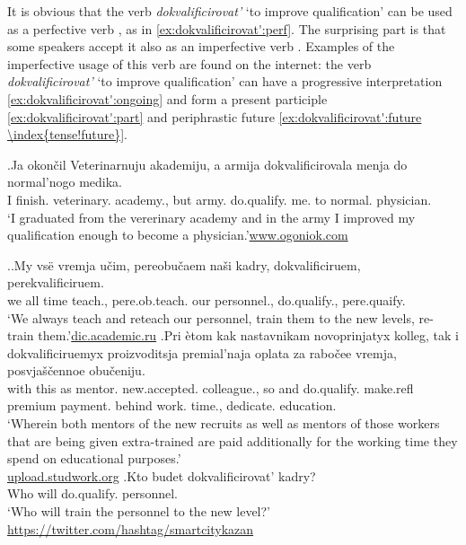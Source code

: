 It is obvious that the verb \textit{dokvalificirovat'} `to improve qualification' can be used as a perfective verb , as in \ref{ex:dokvalificirovat':perf}. The surprising part is that some speakers accept it also as an imperfective verb . Examples of the imperfective usage of this verb are found on the internet: the verb \textit{dokvalificirovat'} `to improve qualification' can have a progressive interpretation  \ref{ex:dokvalificirovat':ongoing} and form a present participle  \ref{ex:dokvalificirovat':part} and periphrastic future  \ref{ex:dokvalificirovat':future \index{tense!future}}. 

\exg.\label{ex:dokvalificirovat':perf}Ja okon\v{c}il Veterinarnuju akademiju, a armija dokvalificirovala menja do normal'nogo medika.\\
I finish. veterinary. academy., but army. do.qualify. me. to normal. physician.\\
\trans `I graduated from the vererinary academy and in the army I improved my qualification enough to become a physician.'\hbox{}\hfill\hbox{\url{www.ogoniok.com}}

\ex.\label{ex:dokvalificirovat':imperf}\ag.\label{ex:dokvalificirovat':ongoing}My vs\"{e} vremja u\v{c}im, pereobu\v{c}aem na\v{s}i kadry, dokvalificiruem, perekvalificiruem.\\
we all time teach., pere.ob.teach. our personnel., do.qualify., pere.quaify.\\
\trans `We always teach and reteach our personnel, train them to the new levels, re-train them.'\hbox{}\hfill\hbox{\url{dic.academic.ru}}
\bg.\label{ex:dokvalificirovat':part}Pri \`{e}tom kak nastavnikam novoprinjatyx kolleg, tak i dokvalificiruemyx proizvoditsja premial'naja oplata za rabo\v{c}ee vremja, posvja\v{s}\v{c}ennoe obu\v{c}eniju.\\
with this as mentor. new.accepted. colleague., so and do.qualify. make.refl premium payment. behind work. time., dedicate. education.\\
\trans `Wherein both mentors of the new recruits as well as mentors of those workers that are being given extra-trained are paid additionally for the working time they spend on educational purposes.'\\\hbox{}\hfill\hbox{\url{upload.studwork.org}}
\bg.\label{ex:dokvalificirovat':future \index{tense!future}}Kto budet dokvalificirovat' kadry?\\
Who will do.qualify. personnel.\\
\trans `Who will train the personnel to the new level?'\\\hbox{}\hfill\hbox{\url{https://twitter.com/hashtag/smartcitykazan}}

